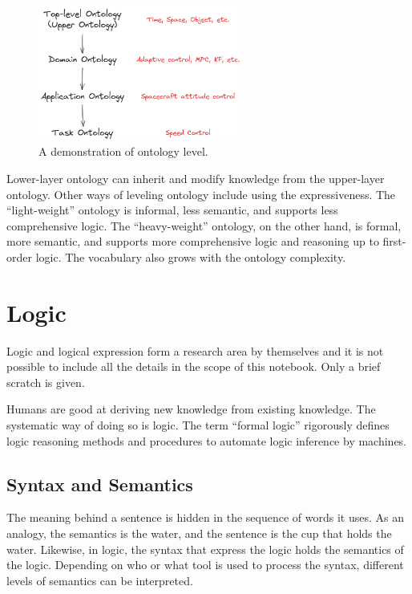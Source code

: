 \begin{figure}[htbp]
	\centering
	\includegraphics[width=0.6\textwidth]{./chapters/ch-semanticwebbasics/figures/ontologylevel.png}
	\caption{A demonstration of ontology level.}
	\label{fig:ontologylevel}
\end{figure}

Lower-layer ontology can inherit and modify knowledge from the upper-layer ontology. Other ways of leveling ontology include using the expressiveness. The ``light-weight'' ontology is informal, less semantic, and supports less comprehensive logic. The ``heavy-weight'' ontology, on the other hand, is formal, more semantic, and supports more comprehensive logic and reasoning up to first-order logic. The vocabulary also grows with the ontology complexity.

\section{Logic} \label{sec:logic}

Logic and logical expression form a research area by themselves and it is not possible to include all the details in the scope of this notebook. Only a brief scratch is given.

Humans are good at deriving new knowledge from existing knowledge. The systematic way of doing so is logic. The term ``formal logic'' rigorously defines logic reasoning methods and procedures to automate logic inference by machines.

\subsection{Syntax and Semantics}

The meaning behind a sentence is hidden in the sequence of words it uses. As an analogy, the semantics is the water, and the sentence is the cup that holds the water. Likewise, in logic, the syntax that express the logic holds the semantics of the logic. Depending on who or what tool is used to process the syntax, different levels of semantics can be interpreted.

